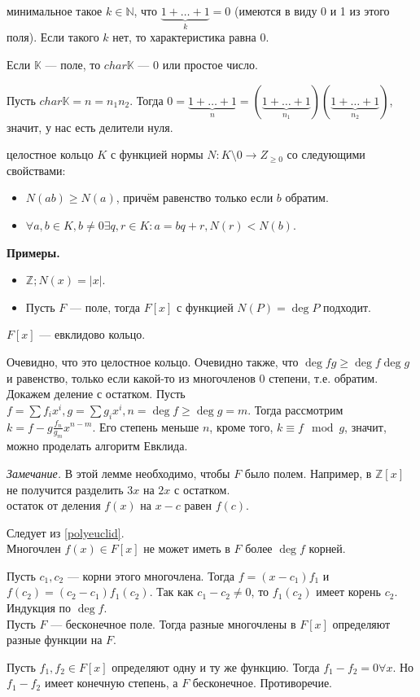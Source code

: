 \documentclass[12pt,a4paper]{article}
\begin{document}
 минимальное такое $k\in \mathbb N$, что $\underbrace{1+\ldots +1}_k=0$ (имеются в виду 0 и 1 из этого поля). Если такого $k$ нет, то характеристика равна 0.

\lemma Если $\mathbb K$ --- поле, то $char\mathbb K$ --- 0 или простое число.

\proof Пусть $char\mathbb K=n=n_1n_2$. Тогда $0=\underbrace{1+\ldots +1}_n=(\underbrace{1+\ldots +1}_{n_1})(\underbrace{1+\ldots +1}_{n_2})$, значит, у нас есть делители нуля.\QEDA\\

\newpage

 целостное кольцо $K$ с функцией нормы $N:K\setminus 0\to Z_{\geq 0}$ со следующими свойствами:

\begin{itemize}
	\item $N(ab)\geq N(a)$, причём равенство только если $b$ обратим.
	\item $\forall a,b\in K,b\neq 0\exists q,r\in K:a=bq+r,N(r)<N(b)$.
\end{itemize}

\textbf{Примеры.}

\begin{itemize}
	\item $\mathbb Z;N(x)=|x|$.
	\item Пусть $F$ --- поле, тогда $F[x]$ с функцией $N(P)=\deg P$ подходит.
\end{itemize}

\lemma $F[x]$ --- евклидово кольцо.\label{polyeuclid}

\proof Очевидно, что это целостное кольцо. Очевидно также, что $\deg fg\geq \deg f\deg g$ и равенство, только если какой-то из многочленов 0 степени, т.е. обратим. Докажем деление с остатком. Пусть $f=\sum f_ix^i,g=\sum g_ix^i,n=\deg f\geq \deg g=m$. Тогда рассмотрим $k=f-g\frac{f_n}{g_m}x^{n-m}$. Его степень меньше $n$, кроме того, $k\equiv f\mod g$, значит, можно проделать алгоритм Евклида. \QEDA

\textit{Замечание.} В этой лемме необходимо, чтобы $F$ было полем. Например, в $\mathbb Z[x]$ не получится разделить $3x$ на $2x$ с остатком.\\

 остаток от деления $f(x)$ на $x-c$ равен $f(c)$.

\proof Следует из \ref{polyeuclid}.\QEDA\\

\theorem Многочлен $f(x)\in F[x]$ не может иметь в $F$ более $\deg f$ корней.

\proof Пусть $c_1,c_2$ --- корни этого многочлена. Тогда $f=(x-c_1)f_1$ и $f(c_2)=(c_2-c_1)f_1(c_2)$. Так как $c_1-c_2\neq 0$, то $f_1(c_2)$ имеет корень $c_2$. Индукция по $\deg f$.\QEDA\\

\lemma Пусть $F$ --- бесконечное поле. Тогда разные многочлены в $F[x]$ определяют разные функции на $F$.

\proof Пусть $f_1,f_2\in F[x]$ определяют одну и ту же функцию. Тогда $f_1-f_2=0\forall x$. Но $f_1-f_2$ имеет конечную степень, а $F$ бесконечное. Противоречие. \QEDA\\
\end{document}
